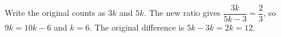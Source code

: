 Write the original counts as $3k$ and $5k$. The new ratio gives $\dfrac{3k}{5k-3}=\dfrac{2}{3}$, so $9k=10k-6$ and $k=6$. The original difference is $5k-3k=2k=\boxed{12}$.

